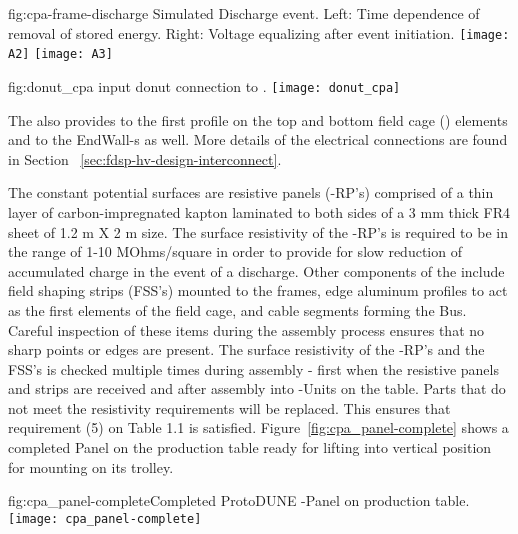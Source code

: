 \begin{dunefigure}
{fig:cpa-frame-discharge}
{Simulated  Discharge event. Left: Time dependence of removal of stored energy. Right: Voltage equalizing after event initiation.}
\texttt{[image: A2]}
\texttt{[image: A3]}
\end{dunefigure}

\begin{dunefigure}{fig:donut_cpa}{ input donut connection to .}
\texttt{[image: donut\_cpa]} %
\end{dunefigure}

The  also provides  to the first profile on the top and bottom field cage () elements and to the EndWall-s as well. More details of the electrical connections are found in Section ~\ref{sec:fdsp-hv-design-interconnect}.

The constant potential surfaces are resistive panels (-RP's) comprised of a thin layer of carbon-impregnated kapton laminated to both sides of a 3 mm thick FR4 sheet of 1.2 m X 2 m size.  The surface resistivity of the -RP's is required to be in the range of 1-10 MOhms/square in order to provide for slow reduction of accumulated charge in the event of a discharge.  Other  components of the  include field shaping strips (FSS's) mounted to the  frames, edge aluminum profiles to act as the first elements of the field cage, and cable segments forming the  Bus. Careful inspection of these items during the assembly process ensures that no sharp points or edges are present. The surface resistivity of the -RP's and the FSS's is checked multiple times during assembly - first when the resistive panels and strips are received and after assembly into -Units on the table.  Parts that do not meet the resistivity requirements will be replaced.  This ensures that requirement (5) on Table 1.1 is satisfied.  Figure~\ref{fig:cpa_panel-complete} shows a completed  Panel on the production table ready for lifting into vertical position for mounting on its trolley.

\begin{dunefigure}{fig:cpa_panel-complete}{Completed ProtoDUNE -Panel on production table.}
\texttt{[image: cpa\_panel-complete]}
\end{dunefigure}

